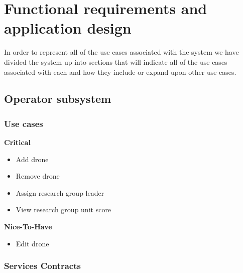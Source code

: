 \documentclass{article}
\begin{document}
\section{Functional requirements and application design}
In order to represent all of the use cases associated with the system we have divided the system up into sections that will indicate all of the use cases associated with each and how they include or expand upon other use cases.
	

\subsection{Operator subsystem}
	\subsubsection{Use cases}

		\begin{flushleft}
			\textbf{Critical}
				\begin{itemize}
	  				\item Add drone
	  				\item Remove drone
					\item Assign research group leader
					\item View research group unit score
				\end{itemize}

			\textbf{Nice-To-Have}
				\begin{itemize}
	  				\item Edit drone
				\end{itemize}
		\end{flushleft}

	\subsubsection{Services Contracts}
\end{document}
